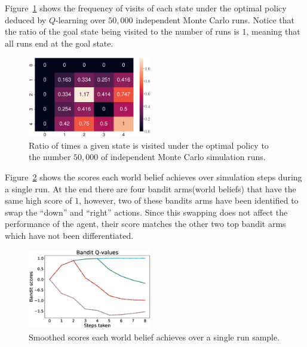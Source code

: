 Figure~\ref{fig:visit_count} shows the frequency of visits of each state under
the optimal policy deduced by $Q$-learning over $50,000$ independent Monte Carlo
runs. Notice that the ratio of the goal state being visited to the number of
runs is $1$, meaning that all runs end at the goal state.
%
\begin{figure}[tb]
    \centering
    \includegraphics[width=0.48\textwidth]{./figures/visit_count_ratio.eps}
    \caption{Ratio of times a given state is visited under the optimal policy to the number $50,000$ of independent Monte Carlo simulation runs.}
    \label{fig:visit_count}
\end{figure}

Figure~\ref{fig:bandit_scores} shows the scores each world belief achieves over
simulation steps during a single run. At the end there are four bandit
arms(world beliefs) that have the same high score of $1$, however, two of these
bandits arms have been identified to swap the ``down'' and ``right'' actions.
Since this swapping does not affect the performance of the agent, their score
matches the other two top bandit arms which have not been differentiated.
%
\begin{figure}[bt]
    \centering
    \includegraphics[width=0.48\textwidth]{./figures/bandit_scores.eps}
    \caption{Smoothed scores each world belief achieves over a single run sample.}
    \label{fig:bandit_scores}
\end{figure}